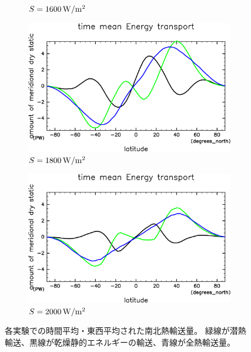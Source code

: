 \documentclass[body]{subfiles}
\begin{document}
\begin{figure}[t]
\begin{subfigure}{.4\textwidth}
		\caption{\(S=1600\hmu{W/m^2}\)}
	\end{subfigure}
	\begin{subfigure}{.4\textwidth}
		\centering
		\includegraphics[width=\columnwidth]{S1800/EngyFlx,time=3650:4015-crop-rotate.pdf}
		\caption{\(S=1800\hmu{W/m^2}\)}
	\end{subfigure}
	\begin{subfigure}{.4\textwidth}
		\centering
		\includegraphics[width=\columnwidth]{S2000/EngyFlx,time=7300:7665-crop-rotate.pdf}
		\caption{\(S=2000\hmu{W/m^2}\)}
	\end{subfigure}
	\caption[各実験での時間平均・東西平均された南北熱輸送量]{
		各実験での時間平均・東西平均された南北熱輸送量。
		緑線が潜熱輸送、黒線が乾燥静的エネルギーの輸送、青線が全熱輸送量。
	}\label{EnFlx}
\end{figure}
\end{document}
